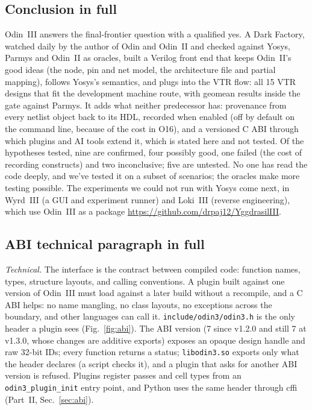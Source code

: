 \documentclass[conference]{IEEEtran}
\newcommand{\code}[1]{\texttt{#1}}
\begin{document}
\subsection{Conclusion in full}

Odin~III answers the final-frontier question with a qualified yes. A Dark Factory, watched daily by the author of Odin and Odin~II and checked against Yosys, Parmys and Odin~II as oracles, built a Verilog front end that keeps Odin~II's good ideas (the node, pin and net model, the architecture file and partial mapping), follows Yosys's semantics, and plugs into the VTR flow: all 15 VTR designs that fit the development machine route, with geomean results inside the gate against Parmys. It adds what neither predecessor has: provenance from every netlist object back to its HDL, recorded when enabled (off by default on the command line, because of the cost in O16), and a versioned C ABI through which plugins and AI tools extend it, which is stated here and not tested. Of the hypotheses tested, nine are confirmed, four possibly good, one failed (the cost of recording constructs) and two inconclusive; five are untested. No one has read the code deeply, and we've tested it on a subset of scenarios; the oracles make more testing possible. The experiments we could not run with Yosys come next, in Wyrd~III (a GUI and experiment runner) and Loki~III (reverse engineering), which use Odin~III as a package \url{https://github.com/drpaj12/YggdrasilIII}.

\subsection{ABI technical paragraph in full}

\emph{Technical.} The interface is the contract between compiled code: function names, types, structure layouts, and calling conventions. A plugin built against one version of Odin~III must load against a later build without a recompile, and a C ABI helps: no name mangling, no class layouts, no exceptions across the boundary, and other languages can call it. \code{include/odin3/odin3.h} is the only header a plugin sees (Fig.~\ref{fig:abi}). The ABI version (7 since v1.2.0 and still 7 at v1.3.0, whose changes are additive exports) exposes an opaque design handle and raw 32-bit IDs; every function returns a status; \code{libodin3.so} exports only what the header declares (a script checks it), and a plugin that asks for another ABI version is refused. Plugins register passes and cell types from an \code{odin3\_plugin\_init} entry point, and Python uses the same header through cffi (Part~II, Sec.~\ref{sec:abi}).
\end{document}
